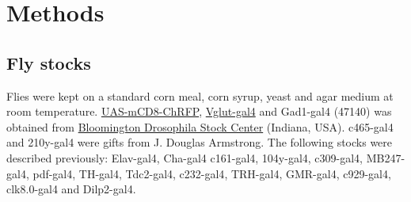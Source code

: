 \section*{Methods}

\subsection*{Fly stocks}

Flies were kept on a standard corn meal, corn syrup, yeast and agar medium at room temperature.
\href{http://flystocks.bio.indiana.edu/Reports/27392.html}{UAS-mCD8-ChRFP}, \href{http://flystocks.bio.indiana.edu/Reports/26160.html}{Vglut-gal4} and Gad1-gal4 (47140) was obtained from \href{http://flystocks.bio.indiana.edu}{Bloomington Drosophila Stock Center} (Indiana, USA).
c465-gal4 and 210y-gal4 were gifts from J. Douglas Armstrong.
The following stocks were described previously: Elav-gal4\cite{Lin:1994vn}, Cha-gal4\cite{11291099} c161-gal4\cite{renn:1999aa}, 104y-gal4\cite{sakai:2006aa}, c309-gal4\cite{connolly:1996aa}, MB247-gal4\cite{zars:2000aa}, pdf-gal4\cite{renn:1999ab}, TH-gal4\cite{friggi-grelin:2003aa}, Tdc2-gal4\cite{alekseyenko:2010aa}, c232-gal4\cite{renn:1999aa}, TRH-gal4\cite{alekseyenko:2010aa}, GMR-gal4\cite{freeman:1996aa}, c929-gal4\cite{taghert:2001aa}, clk8.0-gal4\cite{glossop:2003aa} and Dilp2-gal4\cite{Rulifson:2002cg}.
  
  
  